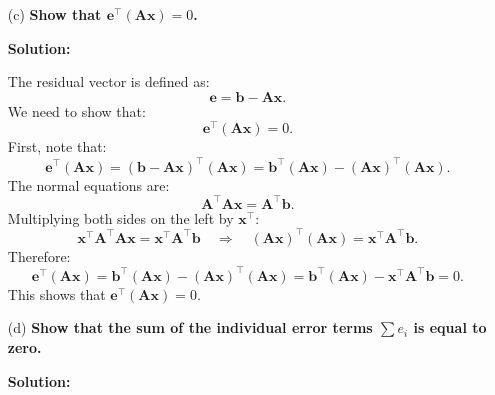 \documentclass{article}
\newcommand{\mA}{\mathbf{A}}
\newcommand{\vx}{\mathbf{x}}
\newcommand{\ve}{\mathbf{e}}
\newcommand{\vb}{\mathbf{b}}
\begin{document}
{\begin{enumerate}
    We have the normal equations:
    \[
    \begin{bmatrix}
    a & b \\
    b & c \\
    \end{bmatrix}
    \begin{bmatrix}
    C \\
    D \\
    \end{bmatrix}
    =
    \begin{bmatrix}
    d \\
    e \\
    \end{bmatrix},
    \]
    where:
    \[
    a = m, \quad b = \sum t_i, \quad c = \sum t_i^2, \quad d = \sum b_i, \quad e = \sum t_i b_i.
    \]
    The determinant of the coefficient matrix is:
    \[
    \Delta = ac - b^2 = m \left( \sum t_i^2 \right) - \left( \sum t_i \right)^2.
    \]
    Solving for $C$ and $D$:
    \[
    C = \frac{d c - b e}{\Delta}, \quad D = \frac{a e - b d}{\Delta}.
    \]
    Substituting the expressions:
    \[
    C = \frac{ (\sum b_i)(\sum t_i^2) - (\sum t_i)(\sum t_i b_i) }{ m (\sum t_i^2) - (\sum t_i)^2 },
    \]
    \[
    D = \frac{ m (\sum t_i b_i) - (\sum t_i)(\sum b_i) }{ m (\sum t_i^2) - (\sum t_i)^2 }.
    \]

    \item[(c)] \textbf{Show that $\ve^\top (\mA \vx) = 0$.}

    \textbf{Solution:}

    The residual vector is defined as:
    \[
    \ve = \vb - \mA \vx.
    \]
    We need to show that:
    \[
    \ve^\top (\mA \vx) = 0.
    \]
    First, note that:
    \[
    \ve^\top (\mA \vx) = (\vb - \mA \vx)^\top (\mA \vx) = \vb^\top (\mA \vx) - (\mA \vx)^\top (\mA \vx).
    \]
    The normal equations are:
    \[
    \mA^\top \mA \vx = \mA^\top \vb.
    \]
    Multiplying both sides on the left by $\vx^\top$:
    \[
    \vx^\top \mA^\top \mA \vx = \vx^\top \mA^\top \vb \quad \Rightarrow \quad (\mA \vx)^\top (\mA \vx) = \vx^\top \mA^\top \vb.
    \]
    Therefore:
    \[
    \ve^\top (\mA \vx) = \vb^\top (\mA \vx) - (\mA \vx)^\top (\mA \vx) = \vb^\top (\mA \vx) - \vx^\top \mA^\top \vb = 0.
    \]
    This shows that $\ve^\top (\mA \vx) = 0$.

    \item[(d)] \textbf{Show that the sum of the individual error terms $\sum e_i$ is equal to zero.}

    \textbf{Solution:}


\end{enumerate}}
\end{document}
